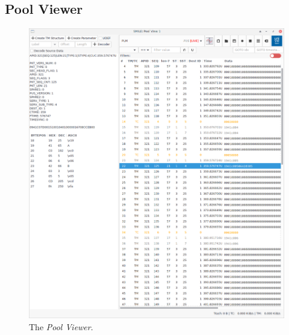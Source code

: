 \subsection{Pool Viewer}
\begin{figure}\label{fig:pvraw}
\includegraphics[width=1.\textwidth]{../shared/images/pvraw.png} 
\caption{The \emph{Pool Viewer}.}
\end{figure}

